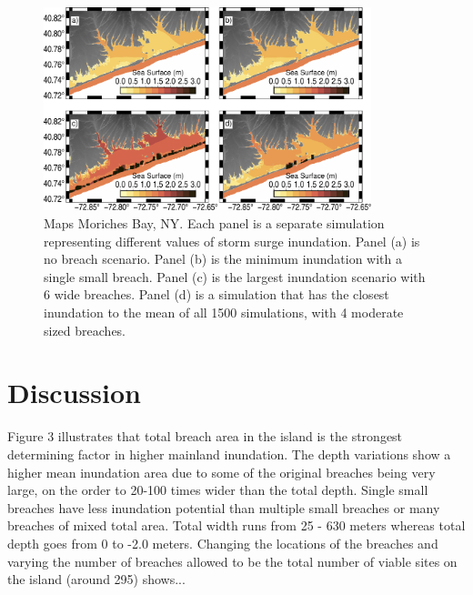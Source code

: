 \documentclass{coastal_paper}
\begin{document}
\begin{figure}
    \centering
    \includegraphics[width=0.85\textwidth]{min_max_mean_inundation.pdf}
    \caption{Maps Moriches Bay, NY. Each panel is a separate simulation representing different values of storm surge inundation. Panel (a) is no breach scenario. Panel (b) is the minimum inundation with a single small breach. Panel (c) is the largest inundation scenario with 6 wide breaches. Panel (d)  is a simulation that has the closest inundation to the mean of all 1500 simulations, with 4 moderate sized breaches.}
    \label{fig6}
\end{figure}



\section{Discussion}
Figure 3 illustrates that total breach area in the island is the strongest determining factor in higher mainland inundation. The depth variations show a higher mean inundation area due to some of the original breaches being very large, on the order to 20-100 times wider than the total depth. Single small breaches have less inundation potential than multiple small breaches or many breaches of mixed total area. Total width runs from 25 - 630 meters whereas total depth goes from 0 to -2.0 meters. 
Changing the locations of the breaches and varying the number of breaches allowed to be the total number of viable sites on the island (around 295) shows...%
\end{document}
